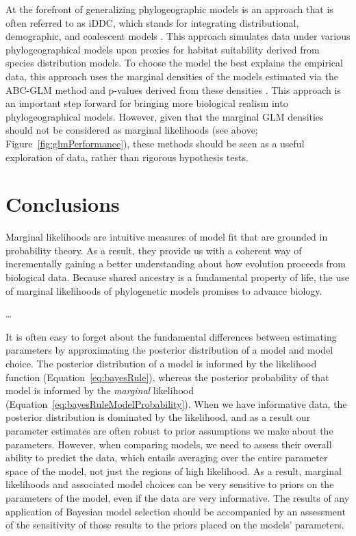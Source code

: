 At the forefront of generalizing phylogeographic models is an approach that is
often referred to as iDDC, which stands for integrating distributional,
demographic, and coalescent models \citep{Papadopoulou2016}.
This approach simulates data under various phylogeographical models upon
proxies for habitat suitability derived from species distribution models.
To choose the model the best explains the empirical data, this approach
uses the marginal densities of the models estimated via the ABC-GLM method
and p-values derived from these densities
\citep{He2013}
\citep{Massatti2016}
\citep{Bemmels2016}
\citep{Knowles2017}
\citep{Papadopoulou2016}.
This approach is an important step forward for bringing more biological realism
into phylogeographical models.
However, given that the marginal GLM densities should not be considered as
marginal likelihoods (see above; Figure~\ref{fig:glmPerformance}), these
methods should be seen as a useful exploration of data, rather than rigorous
hypothesis tests.

\section{Conclusions}

Marginal likelihoods are intuitive measures of model fit that are grounded in
probability theory.
As a result, they provide us with a coherent way of incrementally gaining a
better understanding about how evolution proceeds from biological data.
Because shared ancestry is a fundamental property of life, the use of marginal
likelihoods of phylogenetic models promises to advance biology.

\ldots

It is often easy to forget about the fundamental differences between estimating
parameters by approximating the posterior distribution of a model and model
choice.
The posterior distribution of a model is informed by the likelihood function
(Equation~\ref{eq:bayesRule}),
whereas the posterior probability of that model is informed by the
\emph{marginal} likelihood
(Equation~\ref{eq:bayesRuleModelProbability}).
When we have informative data, the posterior distribution is dominated by the
likelihood, and as a result our parameter estimates are often robust to prior
assumptions we make about the parameters.
However, when comparing models, we need to assess their overall ability to
predict the data, which entails averaging over the entire parameter space of
the model, not just the regions of high likelihood.
As a result, marginal likelihoods and associated model choices can be very
sensitive to priors on the parameters of the model, even if the data are very
informative.
The results of any application of Bayesian model selection should be
accompanied by an assessment of the sensitivity of those results to the priors
placed on the models' parameters.

